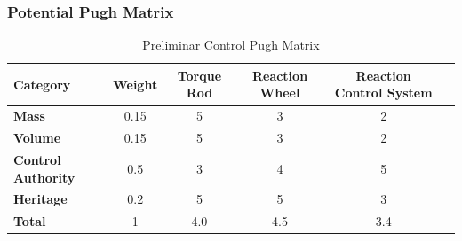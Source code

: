 \subsubsection{Potential Pugh Matrix}

\begin{table}[H]
\centering
\begin{tabular}{|l|c|c|c|c|c|} 
\hline
    \textbf{Category} & \textbf{Weight} & \textbf{Torque Rod} & \textbf{Reaction Wheel} & \textbf{Reaction Control System}
    \\
\hline
    \textbf{Mass} & 0.15 & 5 & 3 & 2
    \\
\hline
    \textbf{Volume} & 0.15 & 5 & 3 & 2 
    \\
\hline
    \textbf{Control Authority} & 0.5 & 3 & 4 & 5
    \\
\hline
    \textbf{Heritage} & 0.2 & 5 & 5 & 3
    \\
\hline
    \textbf{Total} & 1 & 4.0 & 4.5 &  3.4
    \\
\hline
\end{tabular}
\caption{Preliminar Control Pugh Matrix }
\label{tbl:Control_Pugh}
\end{table}
